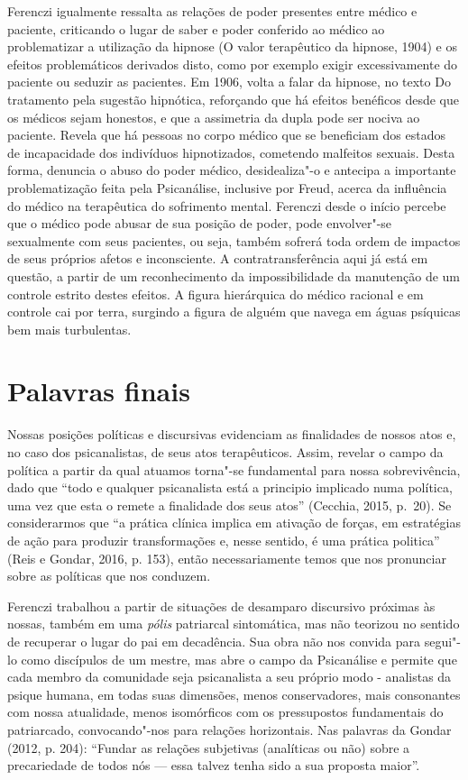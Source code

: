 Ferenczi igualmente ressalta as relações de poder presentes entre médico
e paciente, criticando o lugar de saber e poder conferido ao médico ao
problematizar a utilização da hipnose (O valor terapêutico da hipnose,
1904) e os efeitos problemáticos derivados disto, como por exemplo
exigir excessivamente do paciente ou seduzir as pacientes. Em 1906,
volta a falar da hipnose, no texto Do tratamento pela sugestão
hipnótica, reforçando que há efeitos benéficos desde que os médicos
sejam honestos, e que a assimetria da dupla pode ser nociva ao paciente.
Revela que há pessoas no corpo médico que se beneficiam dos estados de
incapacidade dos indivíduos hipnotizados, cometendo malfeitos sexuais.
Desta forma, denuncia o abuso do poder médico, desidealiza"-o e antecipa
a importante problematização feita pela Psicanálise, inclusive por
Freud, acerca da influência do médico na terapêutica do sofrimento
mental. Ferenczi desde o início percebe que o médico pode abusar de sua
posição de poder, pode envolver"-se sexualmente com seus pacientes, ou
seja, também sofrerá toda ordem de impactos de seus próprios afetos e
inconsciente. A contratransferência aqui já está em questão, a partir de
um reconhecimento da impossibilidade da manutenção de um controle
estrito destes efeitos. A figura hierárquica do médico racional e em
controle cai por terra, surgindo a figura de alguém que navega em águas
psíquicas bem mais turbulentas.

\section{Palavras finais}

Nossas posições políticas e discursivas evidenciam as finalidades de
nossos atos e, no caso dos psicanalistas, de seus atos terapêuticos.
Assim, revelar o campo da política a partir da qual atuamos torna"-se
fundamental para nossa sobrevivência, dado que ``todo e qualquer
psicanalista está a principio implicado numa política, uma vez que esta
o remete a finalidade dos seus atos'' (Cecchia, 2015, p.~20). Se
considerarmos que ``a prática clínica implica em ativação de forças, em
estratégias de ação para produzir transformações e, nesse sentido, é uma
prática politica'' (Reis e Gondar, 2016, p. 153), então necessariamente
temos que nos pronunciar sobre as políticas que nos conduzem.

Ferenczi trabalhou a partir de situações de desamparo discursivo
próximas às nossas, também em uma \emph{pólis} patriarcal sintomática,
mas não teorizou no sentido de recuperar o lugar do pai em decadência.
Sua obra não nos convida para segui"-lo como discípulos de um mestre, mas
abre o campo da Psicanálise e permite que cada membro da comunidade seja
psicanalista a seu próprio modo - analistas da psique humana, em todas
suas dimensões, menos conservadores, mais consonantes com nossa
atualidade, menos isomórficos com os pressupostos fundamentais do
patriarcado, convocando"-nos para relações horizontais. Nas palavras da
Gondar (2012, p. 204): ``Fundar as relações subjetivas (analíticas ou
não) sobre a precariedade de todos nós --- essa talvez tenha sido a sua
proposta maior''.

